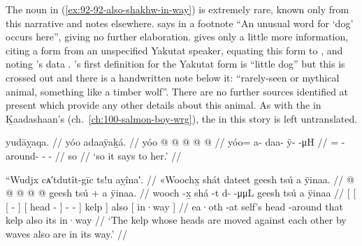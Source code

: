 The noun  in (\ref{ex:92-92-also-shakhw-in-way}) is extremely rare, known only from this narrative and notes elsewhere.
\citeauthor{swanton:1909} says in a footnote “An unusual word for ‘dog’ occurs here”, giving no further elaboration.
\citeauthor{leer:1973} gives only a little more information, citing a form  from an unspecified Yakutat speaker, equating this form to , and noting \citeauthor{swanton:1909}’s data \parencite[10/45]{leer:1973}.
\citeauthor{leer:1973}’s first definition for the Yakutat form  is “little dog” but this is crossed out and there is a handwritten note below it: “rarely-seen or mythical animal, something like a timber wolf”.
There are no further sources identified at present which provide any other details about this animal.
As with the  in Ḵaadashaan’s  (ch.\ \ref{ch:100-salmon-boy-wrg}), the  in this story is left untranslated.

\ex\label{ex:92-93-says-to-her}%
%
\begingl
	\glpreamble	yudāỵaqa. //
	\glpreamble	yóo adaaÿaḵá. //
	\gla	yóo @  @ {} @ {} @ {} @ {} //
	\glb	yóo= a- daa- ÿ-  -μH //
	\glc	{}= - around- -  - //
	\gld	so  {} {} {} {} //
	\glft	‘so it says to her.’
		//
\endgl
\xe

\ex\label{ex:92-94-also-wave-kelp-in-way}%
%
\begingl
	\glpreamble	“Wudjx cᴀ′tdutît-gīc ts!u aỵîna′. //
	\glpreamble	«\!Woochx̱ shát dateet geesh tsú a ÿinaa. //
	\gla	{} {} {}  @ {} {} {} {}  @ {} {}
			 @ {} @ {} @ {} {} geesh {} tsú +
		{} a ÿinaa. {} //
	\glb	{} {} {} wooch -x̱ {} {} {} shá -t {}
			d-  -μμL {} {} geesh {} tsú
		{} a ÿinaa {} //
	\glc	{}[ {}[ {}[  - {}]
			{}[  head - {}]
			-  - \· {}] kelp {}] also
		{}[  in·way {}] //
	\gld	{} {} {} ea·oth -at {} {} self’s head -around {}
			 {} {} \·that {} kelp {} also
		{} its in·way {} //
	\glft	‘The kelp whose heads are moved against each other by waves also are in its way.’
		//
\endgl
\xe

